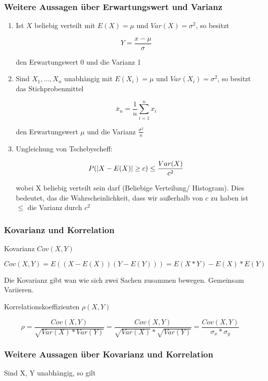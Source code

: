 \documentclass[a4paper]{article}
\begin{document}
\subsubsection{Weitere Aussagen über Erwartungswert und Varianz}

\begin{enumerate}
    \item Ist $X$ beliebig verteilt mit $E(X) = \mu$ und $Var(X) = \sigma^2$, so besitzt

    \[
    Y = \frac{x - \mu}{\sigma}
    \]

    den Erwartungswert 0 und die Varianz 1
    \item Sind $X_1, ..., X_n$ unabhängig mit $E(X_i) = \mu$ und $Var(X_i) = \sigma^2$, so besitzt das Stichprobenmittel

    \[
    \overline{x}_n = \frac{1}{n} \sum_{i=1}^{n} x_i
    \]

    den Erwartungswert $\mu$ und die Varianz $\frac{\sigma^2}{n}$
    \item Ungleichung von Tschebyscheff:
    
    \[
    P(\left\lvert X-E(X) \right\rvert \geq c) \leq \frac{Var(X)}{c^2}
    \]

    wobei X beliebig verteilt sein darf (Beliebige Verteilung/ Histogram). Dies bedeutet, das die Wahrscheinlichkeit, dass wir außerhalb von $c$ zu haben ist $\leq$ die Varianz durch $c^2$
\end{enumerate}

\subsubsection{Kovarianz und Korrelation}

Kovarianz $Cov(X, Y)$

\[
Cov(X, Y) = E((X - E(X)) (Y- E(Y))) = E(X * Y) - E(X) * E(Y)
\]

Die Kovarianz gibt wan wie sich zwei Sachen zusammen bewegen. Gemeinsam Variieren.

Korrelationskoeffizienten $\rho(X, Y)$

\[
\rho = \frac{Cov(X, Y)}{\sqrt{Var(X) * Var(Y)}} = \frac{Cov(X, Y)}{\sqrt{Var(X)} * \sqrt{Var(Y)}} = \frac{Cov(X, Y)}{\sigma_x * \sigma_y}
\]

\subsubsection{Weitere Aussagen über Kovarianz und Korrelation}

Sind X, Y unabhängig, so gilt
\end{document}
